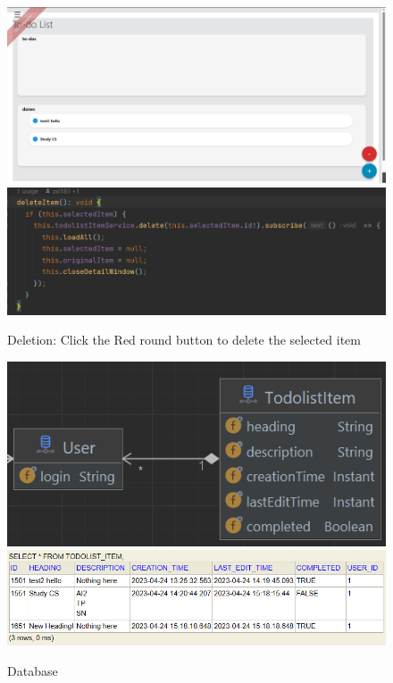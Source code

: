 \documentclass[a4paper]{article}
\begin{document}
\begin{minipage}{\textwidth}
\begin{figure}[H]
  \begin{minipage}{0.42\textwidth}
    \centering
    \includegraphics[width=\linewidth]{./images/Interface_Delete.png} 
  \end{minipage}\hfill
  \begin{minipage}{0.58\textwidth}
    \centering
    \includegraphics[width=\linewidth]{./images/Backend_Delete.png}
  \end{minipage}
  Deletion: Click the Red round button to delete the selected item

  \begin{minipage}{0.5\textwidth}
    \centering
    \includegraphics[width=\linewidth]{./images/JDL_TOdoList.png} 
  \end{minipage}\hfill
  \begin{minipage}{0.5\textwidth}
    \centering
    \includegraphics[width=\linewidth]{./images/Database.png}
  \end{minipage}
  Database

\end{figure}
\end{minipage}
\end{document}
